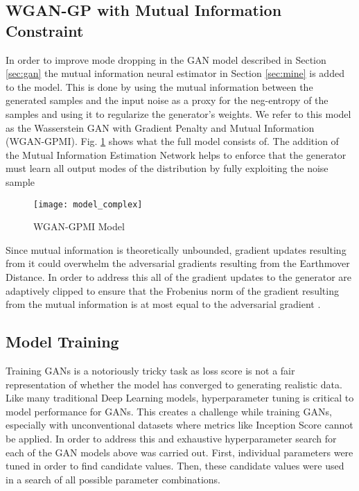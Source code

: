 \subsection{WGAN-GP with Mutual Information Constraint}
\label{sec:gpmi}

In order to improve mode dropping in the GAN model described in Section \ref{sec:gan} the mutual information neural estimator in Section \ref{sec:mine} is added to the model. This is done by using the mutual information between the generated samples and the input noise as a proxy for the neg-entropy of the samples and using it to regularize the generator's weights. We refer to this model as the Wasserstein GAN with Gradient Penalty and Mutual Information (WGAN-GPMI). Fig. \ref{fig:model_complex} shows what the full model consists of. The addition of the Mutual Information Estimation Network helps to enforce that the generator must learn all output modes of the distribution by fully exploiting the noise sample

\begin{figure}[!htbp]
	\centering%
	\texttt{[image: model\_complex]}
	\caption{WGAN-GPMI Model}
	\label{fig:model_complex}
\end{figure}

Since mutual information is theoretically unbounded, gradient updates resulting from it could overwhelm the adversarial gradients resulting from the Earthmover Distance. In order to address this all of the gradient updates to the generator are adaptively clipped to ensure that the Frobenius norm of the gradient resulting from the mutual information is at most equal to the adversarial gradient \cite{Belghazi2018}.


\subsection{Model Training}
\label{sec:training}

Training GANs is a notoriously tricky task as loss score is not a fair representation of whether the model has converged to generating realistic data. Like many traditional Deep Learning models, hyperparameter tuning is critical to model performance for GANs. This creates a challenge while training GANs, especially with unconventional datasets where metrics like Inception Score cannot be applied. In order to address this and exhaustive hyperparameter search for each of the GAN models above was carried out. First, individual parameters were tuned in order to find candidate values. Then, these candidate values were used in a search of all possible parameter combinations.


